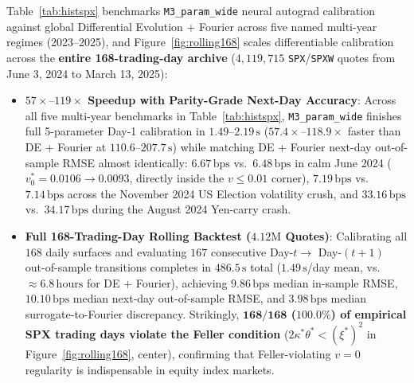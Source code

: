 \documentclass[preprint,12pt]{elsarticle}
\begin{document}
Table~\ref{tab:histspx} benchmarks \texttt{M3\_param\_wide} neural autograd calibration against global Differential Evolution + Fourier across five named multi-year regimes (2023--2025), and Figure~\ref{fig:rolling168} scales differentiable calibration across the \textbf{entire 168-trading-day archive} ($4{,}119{,}715$ \texttt{SPX}/\texttt{SPXW} quotes from June 3, 2024 to March 13, 2025):
\begin{itemize}
  \item \textbf{$57\times\text{--}119\times$ Speedup with Parity-Grade Next-Day Accuracy}: Across all five multi-year benchmarks in Table~\ref{tab:histspx}, \texttt{M3\_param\_wide} finishes full 5-parameter Day-1 calibration in $\mathbf{1.49\text{--}2.19\,\mathrm{s}}$ ($\mathbf{57.4\times\text{--}118.9\times}$ faster than DE + Fourier at $110.6\text{--}207.7\,\mathrm{s}$) while matching DE + Fourier next-day out-of-sample RMSE almost identically: $\mathbf{6.67\,\mathrm{bps}}$ vs.\ $6.48\,\mathrm{bps}$ in calm June 2024 ($v_0^* = 0.0106 \to 0.0093$, directly inside the $v \le 0.01$ corner), $\mathbf{7.19\,\mathrm{bps}}$ vs.\ $7.14\,\mathrm{bps}$ across the November 2024 US Election volatility crush, and $\mathbf{33.16\,\mathrm{bps}}$ vs.\ $34.17\,\mathrm{bps}$ during the August 2024 Yen-carry crash.
  \item \textbf{Full 168-Trading-Day Rolling Backtest ($4.12\text{M}$ Quotes)}: Calibrating all $168$ daily surfaces and evaluating $167$ consecutive Day-$t \to$ Day-$(t+1)$ out-of-sample transitions completes in $\mathbf{486.5\,\mathrm{s}}$ total ($1.49\,\mathrm{s}$/day mean, vs.\ $\approx 6.8\,\mathrm{hours}$ for DE + Fourier), achieving $\mathbf{9.86\,\mathrm{bps}}$ median in-sample RMSE, $\mathbf{10.10\,\mathrm{bps}}$ median next-day out-of-sample RMSE, and $\mathbf{3.98\,\mathrm{bps}}$ median surrogate-to-Fourier discrepancy. Strikingly, \textbf{$\mathbf{168/168}$ ($\mathbf{100.0\%}$) of empirical SPX trading days violate the Feller condition} ($2\kappa^*\theta^* < (\xi^*)^2$ in Figure~\ref{fig:rolling168}, center), confirming that Feller-violating $v = 0$ regularity is indispensable in equity index markets.
\end{itemize}
\end{document}
